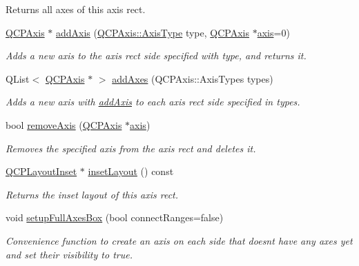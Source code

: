 \begin{DoxyCompactItemize}
\begin{DoxyCompactList}
Returns all axes of this axis rect. \end{DoxyCompactList}\item 
\hyperlink{classQCPAxis}{Q\+C\+P\+Axis} $\ast$ \hyperlink{classQCPAxisRect_a2dc336092ccc57d44a46194c8a23e4f4}{add\+Axis} (\hyperlink{classQCPAxis_ae2bcc1728b382f10f064612b368bc18a}{Q\+C\+P\+Axis\+::\+Axis\+Type} type, \hyperlink{classQCPAxis}{Q\+C\+P\+Axis} $\ast$\hyperlink{classQCPAxisRect_a560de44e47a4af0f86c59102a094b1e4}{axis}=0)
\begin{DoxyCompactList}\small\item\em Adds a new axis to the axis rect side specified with {\itshape type}, and returns it. \end{DoxyCompactList}\item 
Q\+List$<$ \hyperlink{classQCPAxis}{Q\+C\+P\+Axis} $\ast$ $>$ \hyperlink{classQCPAxisRect_a792e1f3d9cb1591fca135bb0de9b81fc}{add\+Axes} (Q\+C\+P\+Axis\+::\+Axis\+Types types)
\begin{DoxyCompactList}\small\item\em Adds a new axis with \hyperlink{classQCPAxisRect_a2dc336092ccc57d44a46194c8a23e4f4}{add\+Axis} to each axis rect side specified in {\itshape types}. \end{DoxyCompactList}\item 
bool \hyperlink{classQCPAxisRect_a03c39cd9704f0d36fb6cf980cdddcbaa}{remove\+Axis} (\hyperlink{classQCPAxis}{Q\+C\+P\+Axis} $\ast$\hyperlink{classQCPAxisRect_a560de44e47a4af0f86c59102a094b1e4}{axis})
\begin{DoxyCompactList}\small\item\em Removes the specified {\itshape axis} from the axis rect and deletes it. \end{DoxyCompactList}\item 
\hyperlink{classQCPLayoutInset}{Q\+C\+P\+Layout\+Inset} $\ast$ \hyperlink{classQCPAxisRect_a4114887c7141b59650b7488f930993e5}{inset\+Layout} () const 
\begin{DoxyCompactList}\small\item\em Returns the inset layout of this axis rect. \end{DoxyCompactList}\item 
void \hyperlink{classQCPAxisRect_a5fa906175447b14206954f77fc7f1ef4}{setup\+Full\+Axes\+Box} (bool connect\+Ranges=false)
\begin{DoxyCompactList}\small\item\em Convenience function to create an axis on each side that doesn\textquotesingle{}t have any axes yet and set their visibility to true. \end{DoxyCompactList}\item 

\end{DoxyCompactItemize}
